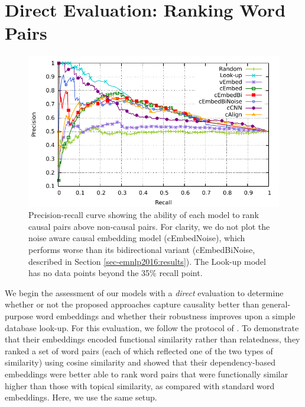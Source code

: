 
\section{Direct Evaluation: Ranking Word Pairs}
\label{sec-emnlp2016:directeval}

\begin{figure}[th!]
\begin{center}
\includegraphics[width=\textwidth]{mainmatter/emnlp2016-causal/direct2.pdf} %
\caption{{Precision-recall curve showing the ability of each model to rank causal pairs above non-causal pairs. For clarity, we do not plot the noise aware causal embedding model (cEmbedNoise), which performs worse than its bidirectional variant (cEmbedBiNoise, described in Section \ref{sec-emnlp2016:results}). The Look-up model has no data points beyond the 35\% recall point.}}
\label{fig:rpcurve_all}
\end{center}
\end{figure}

We begin the assessment of our models with a {\em direct} evaluation to determine whether or not the proposed approaches capture causality better than general-purpose word embeddings and whether their robustness improves upon a simple database look-up.
For this evaluation, we follow the protocol of \citet{levy2014dependency}.  
To demonstrate that their embeddings encoded functional similarity rather than relatedness, they ranked a set of word pairs (each of which reflected one of the two types of similarity) using cosine similarity and showed that their dependency-based embeddings were better able to rank word pairs that were functionally similar higher than those with topical similarity, as compared with standard word embeddings.  Here, we use the same setup. 
 
